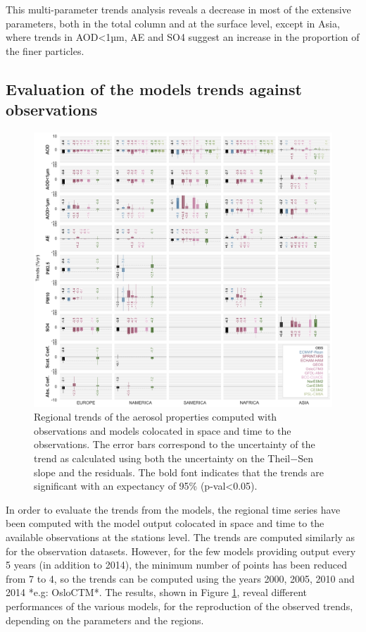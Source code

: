 \documentclass[journal abbreviation, manuscript]{copernicus}
\begin{document}
This multi-parameter trends analysis reveals a decrease in most of the extensive parameters, both in the total column and at the surface level, except in Asia, where trends in AOD<1µm, AE and SO4 suggest an increase in the proportion of the finer particles.

\subsection{Evaluation of the models trends against observations}

\begin{figure}[t]
 \includegraphics[width=16cm]{../scripts/figs/heatmaps/BARS.png}
 \caption{Regional trends of the aerosol properties computed with observations and models colocated in space and time to the observations. The error bars correspond to the uncertainty of the trend as calculated using both the uncertainty on the Theil−Sen slope and the residuals. The bold font indicates that the trends are significant with an expectancy of 95\% (p-val<0.05).}
 \label{fig:bars}
\end{figure}

In order to evaluate the trends from the models, the regional time series have been computed with the model output colocated in space and time to the available observations at the stations level. The trends are computed similarly as for the observation datasets. However, for the few models providing output every 5 years (in addition to 2014), the minimum number of points has been reduced from 7 to 4, so the trends can be computed using the years 2000, 2005, 2010 and 2014 *e.g: OsloCTM*. The results, shown in Figure \ref{fig:bars}, reveal different performances of the various models, for the reproduction of the observed trends, depending on the parameters and the regions.
\end{document}
